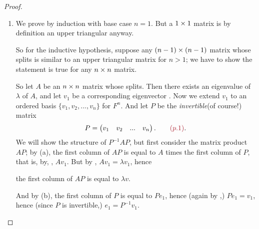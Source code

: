 \begin{proof} \ 

\begin{enumerate}
\item We prove by induction with base case \(n = 1\).
But a \(1 \times 1\) matrix is by definition an upper triangular anyway.

So for the inductive hypothesis, suppose any \((n - 1) \times (n - 1)\) matrix whose \CPOLY{} splits is similar to an upper triangular matrix for \(n > 1\);
we have to show the statement is true for any \(n \times n\) matrix.

So let \(A\) be an \(n \times n\) matrix whose \CPOLY{} splits.
Then there exists an eigenvalue of \(\lambda\) of \(A\), and let \(v_1\) be a corresponding eigenvector .
Now we extend \(v_1\) to an ordered basis \(\{ v_1, v_2, ..., v_n \}\) for \(F^n\).
And let \(P\) be the \emph{invertible}(of course!) matrix
\[
    P = \begin{pmatrix}
            v_1 & v_2 & ... & v_n
    \end{pmatrix}. \quad \quad \MAROON{(p.1)}.
\]
We will show the structure of \(P^{-1} A P\), but first consider the matrix product \(AP\);
by (a), the first column of \(AP\) is equal to \(A\) times the first column of \(P\), that is, by, , \(A v_1\).
But by , \(A v_1 = \lambda v_1\), hence
\begin{center}
    the first column of \(AP\) is equal to \(\lambda v\). \quad \quad {}
\end{center}
And by (b), the first column of \(P\) is equal to \(P e_1\), hence (again by ,) \(P e_1 = v_1\), hence (since \(P\) is invertible,) \(e_1 = P^{-1} v_1\). 


\end{enumerate}
\end{proof}

